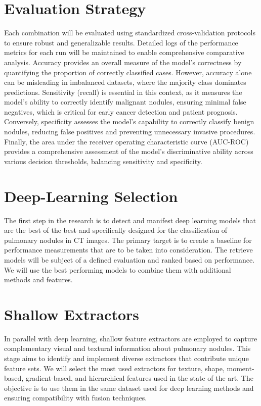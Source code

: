 \section{Evaluation Strategy}
Each combination will be evaluated using standardized cross-validation protocols to ensure robust and generalizable results. Detailed logs of the performance metrics for each run will be maintained to enable comprehensive comparative analysis.
Accuracy provides an overall measure of the model’s correctness by quantifying the proportion of correctly classified cases. However, accuracy alone can be misleading in imbalanced datasets, where the majority class dominates predictions. Sensitivity (recall) is essential in this context, as it measures the model's ability to correctly identify malignant nodules, ensuring minimal false negatives, which is critical for early cancer detection and patient prognosis. Conversely, specificity assesses the model’s capability to correctly classify benign nodules, reducing false positives and preventing unnecessary invasive procedures. Finally, the area under the receiver operating characteristic curve (AUC-ROC) provides a comprehensive assessment of the model's discriminative ability across various decision thresholds, balancing sensitivity and specificity.

\section{Deep-Learning Selection}
The first step in the research is to detect and manifest deep learning models that are the best of the best and specifically designed for the classification of pulmonary nodules in CT images. The primary target is to create a baseline for performance measurements that are to be taken into consideration. The retrieve models will be subject of a defined evaluation and ranked based on performance. We will use the best performing models to combine them with additional methods and features. 

\section{Shallow Extractors}
In parallel with deep learning, shallow feature extractors are employed to capture complementary visual and textural information about pulmonary nodules. This stage aims to identify and implement diverse extractors that contribute unique feature sets. We will select the most used extractors for texture, shape, moment-based, gradient-based, and hierarchical features used in the state of the art.
The objective is to use them in the same dataset used for deep learning methods and ensuring compatibility with fusion techniques.

